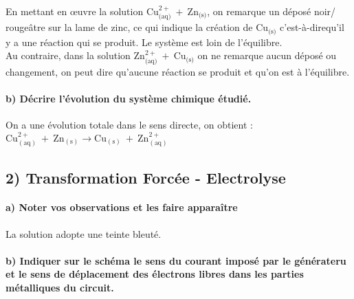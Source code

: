 \documentclass[a4paper, 12pt]{scrartcl}
\newcommand{\cad}{c'est-à-dire}
\begin{document}
En mettant en œuvre la solution $\text{Cu}^{2+}_{\text{(aq)}}\ +\ \text{Zn}_{\text{(s)}}$, on remarque un déposé noir/ rougeâtre sur la lame de zinc, 
ce qui indique la création de $\text{Cu}_{\text{(s)}}$ \cad qu'il y a une réaction qui se produit. Le système est loin de l'équilibre.
\\[2mm]
Au contraire, dans la solution $\text{Zn}^{2+}_{\text{(aq)}}\ +\ \text{Cu}_{\text{(s)}}$ on ne remarque aucun déposé ou changement, 
on peut dire qu'aucune réaction se produit et qu'on est à l'équilibre.

\paragraph*{b) Décrire l'évolution du système chimique étudié.\\[5mm]}

On a une évolution totale dans le sens directe, on obtient :\\ 
$\text{Cu}^{2+}_{(\text{aq})}\ +\ \text{Zn}_{(\text{s})} \longrightarrow \text{Cu}_{(\text{s})}\ +\ \text{Zn}^{2+}_{(\text{aq})}$

\subsection*{2) Transformation Forcée - Electrolyse}

\paragraph*{a) Noter vos observations et les faire apparaître \\[5mm]}

La solution adopte une teinte bleuté.

\paragraph*{b) Indiquer sur le schéma le sens du courant imposé par le générateru 
et le sens de déplacement des électrons libres dans les parties métalliques du circuit.}
\end{document}
